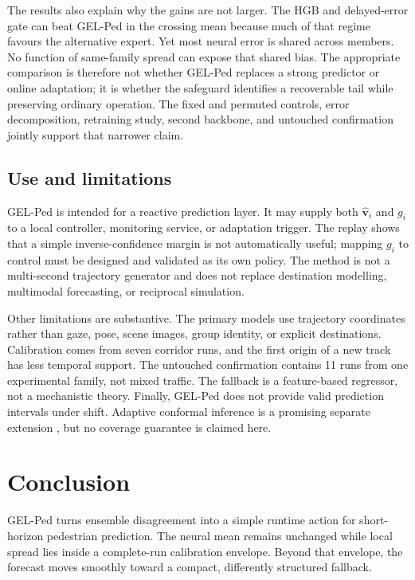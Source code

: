 \documentclass[preprint,11pt,authoryear]{elsarticle}
\begin{document}
The results also explain why the gains are not larger. The HGB and delayed-error gate can beat GEL-Ped in the crossing mean because much of that regime favours the alternative expert. Yet most neural error is shared across members. No function of same-family spread can expose that shared bias. The appropriate comparison is therefore not whether GEL-Ped replaces a strong predictor or online adaptation; it is whether the safeguard identifies a recoverable tail while preserving ordinary operation. The fixed and permuted controls, error decomposition, retraining study, second backbone, and untouched confirmation jointly support that narrower claim.

\subsection{Use and limitations}
GEL-Ped is intended for a reactive prediction layer. It may supply both $\widehat{\mathbf v}_i$ and $g_i$ to a local controller, monitoring service, or adaptation trigger. The replay shows that a simple inverse-confidence margin is not automatically useful; mapping $g_i$ to control must be designed and validated as its own policy. The method is not a multi-second trajectory generator and does not replace destination modelling, multimodal forecasting, or reciprocal simulation.

Other limitations are substantive. The primary models use trajectory coordinates rather than gaze, pose, scene images, group identity, or explicit destinations. Calibration comes from seven corridor runs, and the first origin of a new track has less temporal support. The untouched confirmation contains 11 runs from one experimental family, not mixed traffic. The fallback is a feature-based regressor, not a mechanistic theory. Finally, GEL-Ped does not provide valid prediction intervals under shift. Adaptive conformal inference is a promising separate extension \citep{gibbs2021adaptive,dixit2023adaptive}, but no coverage guarantee is claimed here.

\section{Conclusion}
\label{sec:conclusion}
GEL-Ped turns ensemble disagreement into a simple runtime action for short-horizon pedestrian prediction. The neural mean remains unchanged while local spread lies inside a complete-run calibration envelope. Beyond that envelope, the forecast moves smoothly toward a compact, differently structured fallback.
\end{document}
